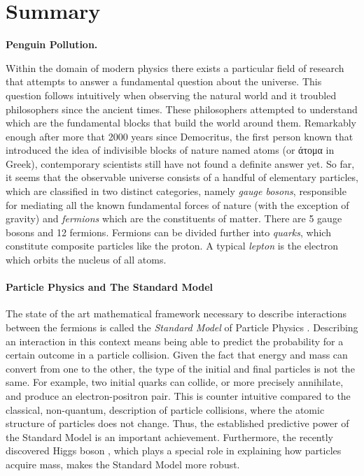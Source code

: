 \chapter*{Summary}
\chaptermark{}

{\Large\bf
  Penguin Pollution.
}
\vspace*{0.05\textwidth}

Within the domain of modern physics there exists a particular field of research
that attempts to answer a fundamental question about the universe. This
question follows intuitively when observing the natural world and it troubled
philosophers since the ancient times. These philosophers attempted to understand
which are the fundamental blocks that build the world around them. Remarkably
enough after more that 2000 years since Democritus, the first person known that
introduced the idea of indivisible blocks of nature named atoms (or \textgreek{άτομα} in Greek),
contemporary scientists still have not found a definite answer yet. So far, it seems that the observable
universe consists of a handful of elementary particles, which are classified in two
distinct categories, namely {\it gauge bosons}, responsible for mediating all the
known fundamental forces of nature (with the exception of gravity) and {\it fermions}
which are the constituents of matter. There are 5 gauge bosons and 12 fermions.
Fermions can be divided further into {\it quarks}, which constitute composite
particles like the proton. A typical {\it lepton} is the electron which orbits
the nucleus of all atoms.

\subsubsection{Particle Physics and The Standard Model}
The state of the art mathematical framework necessary to describe interactions between the
fermions is called the \textit{Standard Model} of Particle Physics \cite{sm-glashow,sm-weinberg,sm-salam}.
Describing an interaction in this context means being able to predict the probability for a certain
outcome in a particle collision. Given the fact that energy and mass can convert
from one to the other, the type of the initial and final particles is not the same. For example,
two initial quarks can collide, or more precisely annihilate, and produce an electron-positron pair.
This is counter intuitive compared to the classical, non-quantum, description of particle collisions,
where the atomic structure of particles does not change. Thus, the established predictive power of
the Standard Model is an important achievement. Furthermore, the recently
discovered Higgs boson \cite{higgs-cms,higgs-atlas}, which plays a special role in explaining how
particles acquire mass, makes the Standard Model more robust.

